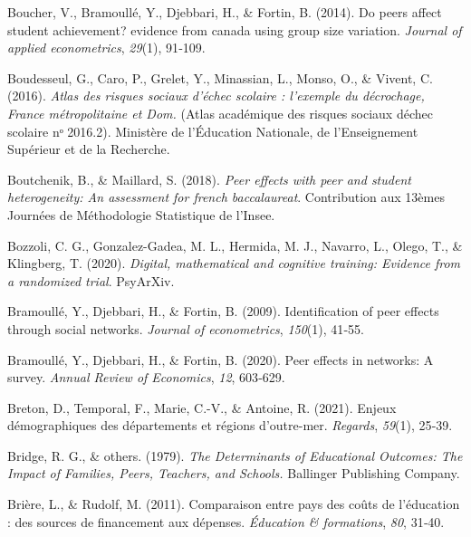 \documentclass[
]{book}
\newlength{\cslhangindent}
\newlength{\cslentryspacingunit} %
\newenvironment{CSLReferences}[2] %
 {%
  \setlength{\parindent}{0pt}
  \ifodd #1
  \let\oldpar\par
  \def\par{\hangindent=\cslhangindent\oldpar}
  \fi
  \setlength{\parskip}{#2\cslentryspacingunit}
 }%
 {}
\begin{document}
\begin{CSLReferences}{1}{2}
\leavevmode{}%
Boucher, V., Bramoullé, Y., Djebbari, H., \& Fortin, B. (2014). Do peers affect student achievement? evidence from canada using group size variation. \emph{Journal of applied econometrics}, \emph{29}(1), 91‑109.

\leavevmode{}%
Boudesseul, G., Caro, P., Grelet, Y., Minassian, L., Monso, O., \& Vivent, C. (2016). \emph{Atlas des risques sociaux d'{é}chec scolaire : l'exemple du d{é}crochage, France m{é}tropolitaine et Dom.} (Atlas académique des risques sociaux d\textquotesingle échec scolaire nᵒ 2016.2). Ministère de l'Éducation Nationale, de l'Enseignement Supérieur et de la Recherche.

\leavevmode{}%
Boutchenik, B., \& Maillard, S. (2018). \emph{Peer effects with peer and student heterogeneity: An assessment for french baccalaureat}. Contribution aux 13èmes Journées de Méthodologie Statistique de l'Insee.

\leavevmode{}%
Bozzoli, C. G., Gonzalez-Gadea, M. L., Hermida, M. J., Navarro, L., Olego, T., \& Klingberg, T. (2020). \emph{Digital, mathematical and cognitive training: Evidence from a randomized trial}. PsyArXiv.

\leavevmode{}%
Bramoullé, Y., Djebbari, H., \& Fortin, B. (2009). Identification of peer effects through social networks. \emph{Journal of econometrics}, \emph{150}(1), 41‑55.

\leavevmode{}%
Bramoullé, Y., Djebbari, H., \& Fortin, B. (2020). Peer effects in networks: A survey. \emph{Annual Review of Economics}, \emph{12}, 603‑629.

\leavevmode{}%
Breton, D., Temporal, F., Marie, C.-V., \& Antoine, R. (2021). Enjeux d{é}mographiques des d{é}partements et r{é}gions d'outre-mer. \emph{Regards}, \emph{59}(1), 25‑39.

\leavevmode{}%
Bridge, R. G., \& others. (1979). \emph{The Determinants of Educational Outcomes: The Impact of Families, Peers, Teachers, and Schools.} Ballinger Publishing Company.

\leavevmode{}%
Brière, L., \& Rudolf, M. (2011). Comparaison entre pays des coûts de l'éducation : des sources de financement aux dépenses. \emph{Éducation \& formations}, \emph{80}, 31‑40.


\end{CSLReferences}
\end{document}
